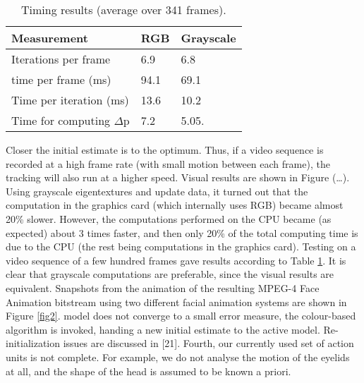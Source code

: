 \documentclass[12pt]{spieman}  %
\begin{document}
\begin{spacing}{2}
\begin{table}[H]
\caption{Timing results (average over 341 frames).} 
\label{tab1}
\begin{center}       
\begin{tabular}{|l|l|l|} 
\hline
\rule[-1ex]{0pt}{3.5ex}  Measurement & RGB & Grayscale \\
\hline\hline
\rule[-1ex]{0pt}{3.5ex}  Iterations per frame & 6.9 & 6.8  \\
\hline
\rule[-1ex]{0pt}{3.5ex} time per frame (ms) & 94.1 & 69.1 \\
\hline
\rule[-1ex]{0pt}{3.5ex}  Time per iteration (ms) & 13.6 & 10.2   \\
\hline
\rule[-1ex]{0pt}{3.5ex} Time for computing $\Delta$p & 7.2 & 5.05. \\
\hline 
\end{tabular}
\end{center}
\end{table}
Closer the initial estimate is to the optimum. Thus, if a video sequence is recorded at a high frame rate (with small motion between each frame), the tracking will also run at a higher speed. Visual results are shown in Figure (…). Using grayscale eigentextures and update data, it turned out that the computation in the graphics card (which internally uses RGB) became almost 20\% slower. However, the computations performed on the CPU became (as expected) about 3 times faster, and then only 20\% of the total computing time is due to the CPU (the rest being computations in the graphics card). Testing on a video sequence of a few hundred frames gave results according to Table \ref{tab1}. It is clear that grayscale computations are preferable, since the visual results are equivalent. Snapshots from the animation of the resulting MPEG-4 Face Animation bitstream using two different facial animation systems are shown in Figure \ref{fig2}. model does not converge to a small error measure, the colour-based algorithm is invoked, handing a new initial estimate to the active model. Re-initialization issues are discussed in [21]. Fourth, our currently used set of action units is not complete. For example, we do not analyse the motion of the eyelids at all, and the shape of the head is assumed to be known a priori.
\end{spacing}
\end{document}
